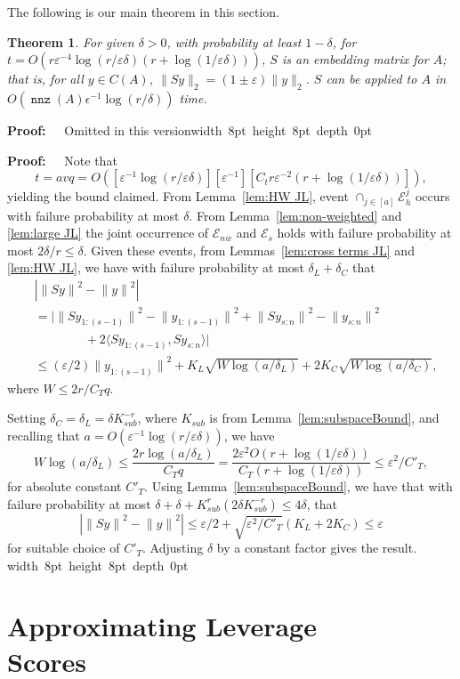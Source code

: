 \documentclass{sig-alternate}
\newcommand{\norm}[1]{{\| #1 \|}}
\newcommand{\cE}{\mathcal{E}}
\DeclareMathOperator{\nnz}{\mathtt{nnz}}
\newcommand\scn{_{s:n}}
\newcommand\kv{a}
\newcommand\gdelta{\delta}
\newcommand\STOComitedproof[1] {\ifSTOC \begin{proof} Omitted in this version\end{proof}\else #1 \fi }
\newcommand{\eps}{\varepsilon}
\newtheorem{theorem}{Theorem}
\def\FullBox{\hbox{\vrule width 8pt height 8pt depth 0pt}}
\def\qed{\ifmmode\qquad\FullBox\else{\unskip\nobreak\hfil
\penalty50\hskip1em\null\nobreak\hfil\FullBox
\parfillskip=0pt\finalhyphendemerits=0\endgraf}\fi}
\newenvironment{proof}{\begin{trivlist} \item {\bf Proof:~~}}
  {\qed\end{trivlist}}
\begin{document}
The following is our main theorem in this section.
\begin{theorem}\label{thm:jlmain}
For given $\delta>0$, 
with probability at least $1-\gdelta$, for $t= O( r \eps^{-4} \log(r/\eps\gdelta)(r + \log(1/\eps\gdelta)))$,
$S$ is an embedding matrix for $A$;
that is, for all $y \in C(A)$, $\|Sy\|_2 = (1 \pm \eps)\|y\|_2$. 
$S$ can be applied to $A$ in $O(\nnz(A)\epsilon^{-1} \log (r/\gdelta))$ time.
\end{theorem}
\STOComitedproof{
\begin{proof}
Note that
\[
t=\kv v q = O([\eps^{-1}\log(r/\eps\gdelta)][\eps^{-1}][C_t r\eps^{-2}(r+\log(1/\eps\gdelta))]),
\]
yielding the bound claimed.
From Lemma~\ref{lem:HW JL}, event $\cap_{j\in[\kv]} \cE^j_h$ occurs with
failure probability at most $\gdelta$.
From Lemma~\ref{lem:non-weighted} and \ref{lem:large JL}
the joint occurrence of $\cE_{nw}$
and $\cE_s$ holds with failure probability at most $2\gdelta/r\le \gdelta$.
Given these events, from Lemmas~\ref{lem:cross terms JL} and
\ref{lem:HW JL}, we have with failure probability at most $\delta_L + \delta_C$
that
\begin{align*}
& | \norm{Sy}^2 - \norm{y}^2|
	\\  & = | \norm{Sy_{1:(s-1)}}^2 - \norm{y_{1:(s-1)}}^2
		+ \norm{Sy\scn}^2 - \norm{y\scn}^2
	\\ & \qquad\qquad	+ 2 \langle Sy_{1:(s-1)}, Sy\scn \rangle |
	\\ & \le (\eps/2) \norm{y_{1:(s-1)}}^2
		+  K_L\sqrt{W\log(a/\delta_L)}
		+ 2 K_C \sqrt{W \log(a/\delta_C)},
\end{align*}
where $W\le 2r/C_Tq$.

Setting $\delta_C = \delta_L = \gdelta K_{sub}^{-r}$,
where $K_{sub}$ is from Lemma~\ref{lem:subspaceBound},
and recalling that $\kv=O(\eps^{-1}\log(r/\eps\gdelta))$,
we have 
\[
W \log(a/\delta_L)
	\leq \frac{2r\log(a/\delta_L)}{C_T q}
	= \frac{2\eps^2 O(r + \log(1/\eps\gdelta))}{C_T (r + \log(1/\eps\gdelta))}
	\le \eps^2/C'_T,
\]
for absolute constant $C'_T$.
Using Lemma~\ref{lem:subspaceBound},
we have that with failure probability at most
$\gdelta + \gdelta +K_{sub}^r(2\gdelta K_{sub}^{-r})\le 4\gdelta$,
that
\[
| \norm{Sy}^2 - \norm{y}^2|
	\le \eps/2 +\sqrt{\eps^2/C'_T} (K_L + 2K_C)
	\le \eps
\]
for suitable choice of $C'_T$. Adjusting $\gdelta$ by a constant factor gives the result.
\end{proof}
}



\ifSTOC
\section{Approximating Leverage \\ Scores}\label{sec:leverage}
\else
\end{document}
